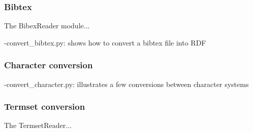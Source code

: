 \documentclass[]{article}
\begin{document}
\subsubsection{Bibtex}
The BibexReader module...

-convert\_bibtex.py: shows how to convert a bibtex file into RDF

\subsubsection{Character conversion}
-convert\_character.py: illustrates a few conversions between character systems

\subsubsection{Termset conversion}
The TermsetReader...





\end{document}

